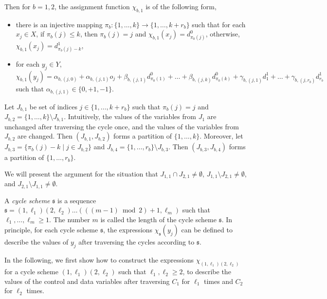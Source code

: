 \documentclass[runningheads,a4paper]{llncs}
\def\schm{{\mathfrak{s} }}
\begin{document}
Then for $b=1,2$, the assignment function $\chi_{b,1}$ is of the following form,
\begin{itemize}
\item there is an injective mapping $\pi_b: \{1,\dots,k\} \rightarrow \{1,\dots, k+r_b\}$ such that for each $x_j \in X$, if $\pi_b(j) \le k$, then $\pi_b(j)=j$ and $\chi_{b,1}(x_j)=d^0_{\pi_0(j)}$, otherwise, $\chi_{b,1}(x_j)=d^1_{\pi_b(j)-k}$,
% 
\item for each $y_j \in Y$, $\chi_{b,1}(y_j) = \alpha_{b,(j,0)} + \alpha_{b,(j,1)} o_j + \beta_{b,(j,1)} d^0_{\pi_0(1)} + \dots + \beta_{b,(j,k)} d^0_{\pi_0(k)} + \gamma_{b,(j,1)} d^1_1 +\dots + \gamma_{b,(j,r_b)} d^1_{r_b}$ such that $\alpha_{b,(j,1)} \in \{0,+1,-1\}$.
\end{itemize}

Let $J_{b,1}$ be set of indices $j \in \{1,\dots,k+r_b\}$ such that $\pi_b(j)= j$ and $J_{b,2} = \{1,\dots,k\} \setminus J_{b,1}$. Intuitively, the values of the variables from $J_1$ are  unchanged after traversing the cycle once, and the values of the variables from  $J_{b,2}$ are changed. Then $(J_{b,1}, J_{b,2})$ forms a partition of $\{1,\dots,k\}$. Moreover, let $J_{b,3}=\{\pi_b(j)-k \mid j \in J_{b,2}\}$ and $J_{b,4} = \{1,\dots,r_b\} \setminus J_{b,3}$. Then $(J_{b,3}, J_{b,4})$ forms a partition of $\{1,\dots,r_b\}$.

We will present the argument for the situation that $J_{1,1} \cap J_{2,1} \neq \emptyset$, $J_{1,1} \setminus J_{2,1} \neq \emptyset$, and $J_{2,1} \setminus J_{1,1} \neq \emptyset$.

A \emph{cycle scheme} $\schm$ is a sequence $\schm=(1,\ell_1) (2, \ell_2 ) \dots (((m-1) \bmod 2)+1, \ell_m)$ such that $\ell_1,\dots, \ell_m \ge 1$. The number $m$ is called the length of the cycle scheme $\schm$. In principle, for each cycle scheme $\schm$, the expressions $\chi_{\schm}(y_j)$ can be defined to describe the values of $y_j$ after traversing the cycles according to $\schm$.


In the following, we first show how to construct the expressions $\chi_{(1,\ell_1)(2,\ell_2)}$ for a cycle scheme $(1,\ell_1)(2,\ell_2)$ such that $\ell_1,\ell_2 \ge 2$, to describe the values of the control and data variables after traversing $C_1$ for $\ell_1$ times and $C_2$ for $\ell_2$ times.
\end{document}

